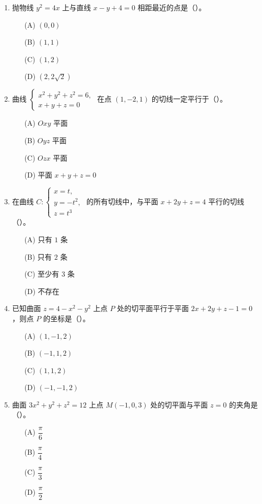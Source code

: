 \documentclass[lang=cn,11pt]{elegantbook}
\begin{document}
\begin{exercise}
\begin{enumerate}
  \item 抛物线 $y^2=4x$ 上与直线 $x-y+4=0$ 相距最近的点是（\qquad）。
    \begin{enumerate}
      \item[(A)] $(0,0)$
      \item[(B)] $(1,1)$
      \item[(C)] $(1,2)$
      \item[(D)] $(2,2\sqrt{2})$
    \end{enumerate}

  \item 曲线 $\begin{cases}x^2+y^2+z^2=6,\\ x+y+z=0\end{cases}$ 在点 $(1,-2,1)$ 的切线一定平行于（\qquad）。
    \begin{enumerate}
      \item[(A)] $Oxy$ 平面
      \item[(B)] $Oyz$ 平面
      \item[(C)] $Ozx$ 平面
      \item[(D)] 平面 $x+y+z=0$
    \end{enumerate}

  \item 在曲线 $C:\begin{cases}x=t,\\ y=-t^2,\\ z=t^3\end{cases}$ 的所有切线中，与平面 $x+2y+z=4$ 平行的切线（\qquad）。
    \begin{enumerate}
      \item[(A)] 只有 $1$ 条
      \item[(B)] 只有 $2$ 条
      \item[(C)] 至少有 $3$ 条
      \item[(D)] 不存在
    \end{enumerate}

  \item 已知曲面 $z=4-x^2-y^2$ 上点 $P$ 处的切平面平行于平面 $2x+2y+z-1=0$，则点 $P$ 的坐标是（\qquad）。
    \begin{enumerate}
      \item[(A)] $(1,-1,2)$
      \item[(B)] $(-1,1,2)$
      \item[(C)] $(1,1,2)$
      \item[(D)] $(-1,-1,2)$
    \end{enumerate}

  \item 曲面 $3x^2+y^2+z^2=12$ 上点 $M(-1,0,3)$ 处的切平面与平面 $z=0$ 的夹角是（\qquad）。
    \begin{enumerate}
      \item[(A)] $\dfrac{\pi}{6}$
      \item[(B)] $\dfrac{\pi}{4}$
      \item[(C)] $\dfrac{\pi}{3}$
      \item[(D)] $\dfrac{\pi}{2}$
    \end{enumerate}


\end{enumerate}
\end{exercise}
\end{document}
